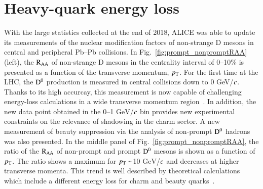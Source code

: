 \documentclass[3p,times,procedia]{elsarticle}
\newcommand{\GeV}{\mathrm{GeV}}
\newcommand{\pt}{p_{\rm T}}
\newcommand{\Dzero}{{\rm D^0}}
\newcommand{\RAA}{\rm R_{AA}}
\begin{document}
\section{Heavy-quark energy loss}
\label{eloss}
With the large statistics collected at the end of 2018, ALICE was able to update its measurements of the nuclear modification factors of 
non-strange D mesons in central and peripheral Pb--Pb collisions. In Fig.~\ref{fig:prompt_nonpromptRAA} (left), the $\RAA$ of non-strange D mesons in the centrality 
interval of 0--10$\%$ is presented as a function of the transverse momentum, $\pt$. For the first time at the LHC, the $\Dzero$ production is measured 
in central collisions down to 0 GeV/$\it{c}$. Thanks to its high accurcay, this measurement is now capable of challenging energy-loss calculations in a wide 
transverse momentum region~\cite{bamps,tamu,phsd,sHQ,catania}. In addition, the new data point obtained in the 0--1 $\GeV$/$\it{c}$ bin provides new experimental constraints on the relevance of 
shadowing in the charm sector. A new measurement of beauty suppression via the analysis of non-prompt $\Dzero$ hadrons 
was also presented. In the middle panel of Fig.~\ref{fig:prompt_nonpromptRAA}, the ratio of the $\RAA$ of non-prompt and prompt $\Dzero$ mesons is shown
as a function of $\pt$. The ratio shows a maximum for $\pt \sim$10 $\GeV$/$\it{c}$ and decreases at higher transverse momenta. This trend is well 
described by theoretical calculations which include a different energy loss for charm and beauty quarks~\cite{tamu,sHQ,cujet3}. 
\end{document}
